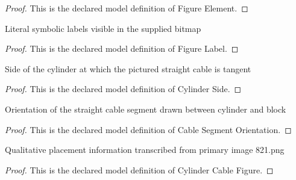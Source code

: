 \begin{proof}
  This is the declared model definition of Figure Element.
\end{proof}
\begin{definition}
  \label{def:physics:phyx-mini-0821:phyxminiproblems-problemphyxmini0821-figurelabel}
  Literal symbolic labels visible in the supplied bitmap
\end{definition}
\begin{proof}
  This is the declared model definition of Figure Label.
\end{proof}
\begin{definition}
  \label{def:physics:phyx-mini-0821:phyxminiproblems-problemphyxmini0821-cylinderside}
  Side of the cylinder at which the pictured straight cable is tangent
\end{definition}
\begin{proof}
  This is the declared model definition of Cylinder Side.
\end{proof}
\begin{definition}
  \label{def:physics:phyx-mini-0821:phyxminiproblems-problemphyxmini0821-cablesegmentorientation}
  Orientation of the straight cable segment drawn between cylinder and block
\end{definition}
\begin{proof}
  This is the declared model definition of Cable Segment Orientation.
\end{proof}
\begin{definition}
  \label{def:physics:phyx-mini-0821:phyxminiproblems-problemphyxmini0821-cylindercablefigure}
  Qualitative placement information transcribed from primary image 821.png
\end{definition}
\begin{proof}
  This is the declared model definition of Cylinder Cable Figure.
\end{proof}
